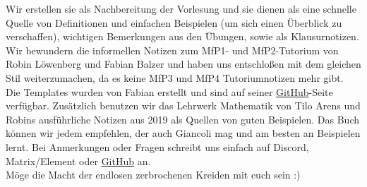 Wir erstellen sie als Nachbereitung der Vorlesung und sie dienen als eine schnelle Quelle von Definitionen und einfachen Beispielen (um sich einen Überblick zu verschaffen), wichtigen Bemerkungen aus den Übungen, sowie als Klausurnotizen. Wir bewundern die informellen Notizen zum MfP1- und MfP2-Tutorium von Robin Löwenberg und Fabian Balzer und haben uns entschloßen mit dem gleichen Stil weiterzumachen, da es keine MfP3 und MfP4 Tutoriumnotizen mehr gibt. Die Templates wurden von Fabian erstellt und sind auf seiner \href{https://github.com/Fabian-Balzer/MfP2-Notizen}{GitHub}-Seite verfügbar. Zusätzlich benutzen wir das Lehrwerk Mathematik von Tilo Arens und Robins ausführliche Notizen aus 2019 als Quellen von guten Beispielen. Das Buch können wir jedem empfehlen, der auch Giancoli mag und am besten an Beispielen lernt. Bei Anmerkungen oder Fragen schreibt uns einfach auf Discord, Matrix/Element oder \href{https://github.com/luxdragon/MfP3-Notizen}{GitHub} an. \\ 

Möge die Macht der endlosen zerbrochenen Kreiden mit euch sein :)

\cfoot{\pagemark}
